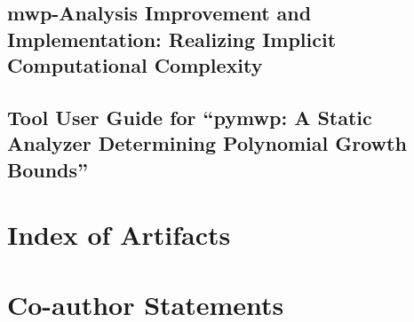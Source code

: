     \section{mwp-Analysis Improvement and Implementation: Realizing Implicit
    Computational Complexity}\label{sec:fscd}
    
    \clearpage

    \section{Tool User Guide for \enquote{pymwp: A Static Analyzer Determining
    Polynomial Growth Bounds}}\label{app:toolguide}
    
    \clearpage

\chapter{Index of Artifacts}\label{app:sec:artifacts}

\clearpage

\chapter{Co-author Statements}\label{app:sec:coauth}

\clearpage

\pagestyle{plain}
\printglossary[type=\acronymtype]
\clearpage

\pagestyle{plain}
\printglossary[type=symbols]
\clearpage

\printindex
